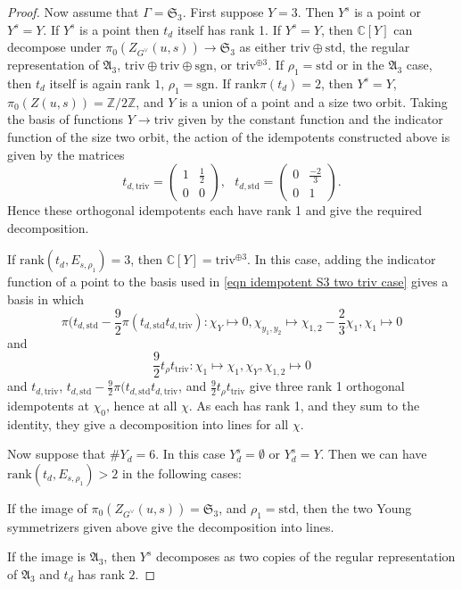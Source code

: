 \documentclass[10pt,a4paper]{amsart}
\newcommand{\An}{\mathfrak{A}}
\newcommand{\C}{\mathbb{C}}
\newcommand{\Sn}{\mathfrak{S}}
\newcommand{\Z}{\mathbb{Z}}
\newcommand{\sgn}{\mathrm{sgn}}
\newcommand{\std}{\mathrm{std}}
\newcommand{\triv}{\mathrm{triv}}
\begin{document}
\begin{proof}
Now assume that $\Gamma=\Sn_3$.
First suppose $Y=3$. Then $Y^s$ is a point or $Y^s=Y$. 
If $Y^s$ is a point then $t_d$ itself has rank 1. If $Y^s=Y$, then $\C[Y]$ can decompose under $\pi_0(Z_{G^\vee}(u,s))\to\Sn_3$ as either $\triv\oplus\std$, the regular representation of $\An_3$, $\triv\oplus\triv\oplus\sgn$, or $\triv^{\oplus 3}$. If $\rho_1=\std$ or in the $\An_3$ case, then $t_d$ itself is again rank $1$, $\rho_1=\sgn$. If $\mathrm{rank}\pi(t_d)=2$, then $Y^s=Y$, $\pi_0(Z(u,s))=\Z/2\Z$, and $Y$ is a union of a point and a size two orbit. Taking the basis of functions $Y\to\triv$ given by the constant function and the indicator function of the size two orbit,  the action of the idempotents constructed above is given by the matrices
%
\begin{equation}
\label{eqn idempotent S3 two triv case}
t_{d,\triv}=\begin{pmatrix}
1&\frac{1}{2}\\
0&0
\end{pmatrix},~~~
t_{d,\std}=\begin{pmatrix}
0&\frac{-2}{3}\\
0&1
\end{pmatrix}.
\end{equation}
%
Hence these orthogonal idempotents each have rank 1 and give the required decomposition.

If $\mathrm{rank}(t_d, E_{s,\rho_1})=3$, then $\C[Y]=\triv^{\oplus 3}$. In this case, adding the indicator function of a point to the basis used in \eqref{eqn idempotent S3 two triv case} gives a basis in which
%
\[
\pi(t_{d,\std}-\frac{9}{2}\pi(t_{d,\std}t_{d,\triv})\colon \chi_Y\mapsto 0, \chi_{y_1,y_2}\mapsto \chi_{1,2}-\frac{2}{3}\chi_1, \chi_1\mapsto 0
\]
and
\[
\frac{9}{2}t_{\rho}t_{\triv}\colon \chi_1\mapsto \chi_1, \chi_Y,\chi_{1,2}\mapsto 0
\]
and $t_{d,\triv}$, $t_{d,\std}-\frac{9}{2}\pi(t_{d,\std}t_{d,\triv}$, and $\frac{9}{2}t_{\rho}t_{\triv}$ give three rank 1 orthogonal idempotents at $\chi_0$, hence at all $\chi$. As each has rank 1, and they sum to the identity, they give a decomposition into lines for all $\chi$.

Now suppose that $\# Y_d=6$. In this case $Y_d^s=\emptyset$ or $Y_d^s=Y$. Then we can have $\mathrm{rank}(t_d, E_{s,\rho_1})>2$ in the following cases: 

If the image of $\pi_0(Z_{G^\vee}(u,s))=\Sn_3$, and $\rho_1=\std$, then the two Young symmetrizers given above give the decomposition into lines.

If the image is $\An_3$, then $Y^s$ decomposes as two copies of the regular representation of $\An_3$ and $t_d$ has rank $2$.


\end{proof}
\end{document}
